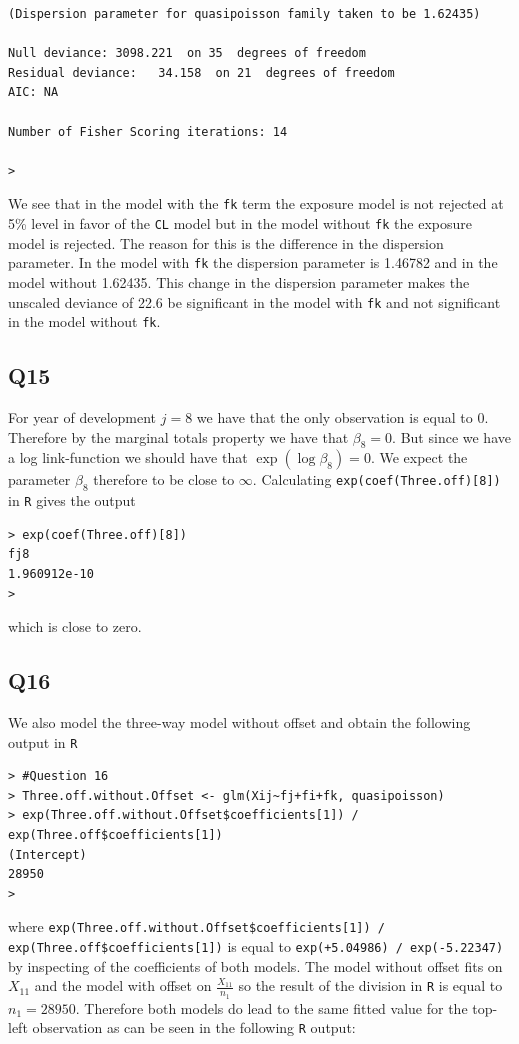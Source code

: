 \documentclass[11pt]{article}
\begin{document}
\begin{verbatim}
(Dispersion parameter for quasipoisson family taken to be 1.62435)

Null deviance: 3098.221  on 35  degrees of freedom
Residual deviance:   34.158  on 21  degrees of freedom
AIC: NA

Number of Fisher Scoring iterations: 14

>
\end{verbatim}

We see that in the model with the \verb|fk| term the exposure model is not rejected at 5\% level in favor of the \verb|CL| model but in the model without \verb|fk| the exposure model is rejected. The reason for this is the difference in the dispersion parameter. In the model with \verb|fk| the dispersion parameter is 1.46782 and in the model without 1.62435. This change in the dispersion parameter makes the unscaled deviance of 22.6 be significant in the model with \verb|fk| and not significant in the model without \verb|fk|.

\subsection*{Q15}
For year of development $j=8$ we have that the only observation is equal to 0. Therefore by the marginal totals property we have that $\beta_8 = 0$. But since we have a log link-function we should have that $\exp(\log \beta_8) = 0$. We expect the parameter $\beta_8$ therefore to be close to $\infty$. Calculating \verb|exp(coef(Three.off)[8])| in \verb|R| gives the output 
\begin{verbatim}
> exp(coef(Three.off)[8])
fj8 
1.960912e-10 
>
\end{verbatim}
which is close to zero.

\subsection*{Q16}
We also model the three-way model without offset and obtain the following output in \verb|R|
\begin{verbatim}
> #Question 16
> Three.off.without.Offset <- glm(Xij~fj+fi+fk, quasipoisson)
> exp(Three.off.without.Offset$coefficients[1]) / exp(Three.off$coefficients[1])
(Intercept) 
28950 
>
\end{verbatim}
where \verb|exp(Three.off.without.Offset$coefficients[1]) / exp(Three.off$coefficients[1])| is equal to \verb|exp(+5.04986) / exp(-5.22347)| by inspecting of the coefficients of both models. The model without offset fits on $X_{11}$ and the model with offset on $\frac{X_{11}}{n_1}$ so the result of the division in \verb|R| is equal to $n_1 = 28950$. Therefore both models do lead to the same fitted value for the top-left observation as can be seen in the following \verb|R| output:
\end{document}
